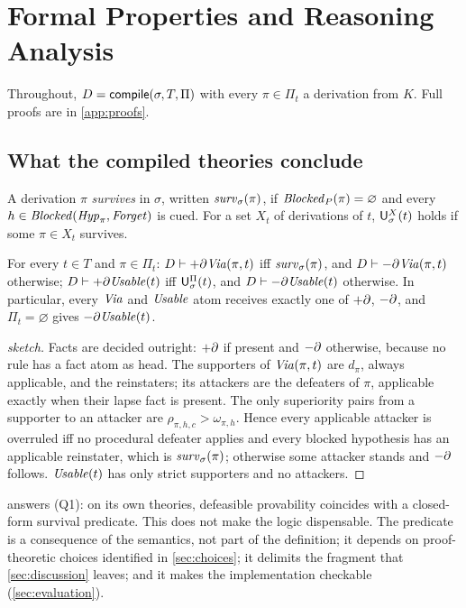 \section{Formal Properties and Reasoning Analysis}
\label{sec:properties}

Throughout, $D=\mathsf{compile}(\sigma,T,\Pi)$ with every $\pi\in\Pi_t$ a derivation from $K$. Full proofs are in \cref{app:proofs}.

\subsection{What the compiled theories conclude}

\begin{definition}[Survival]\label{def:surv}
A derivation $\pi$ \emph{survives} in $\sigma$, written $\mathit{surv}_\sigma(\pi)$, if $\mathit{Blocked}_{P}(\pi)=\varnothing$ and every $h\in\mathit{Blocked}(\mathit{Hyp}_\pi,\mathit{Forget})$ is cued. For a set $X_t$ of derivations of $t$, $\mathsf{U}^{X}_{\sigma}(t)$ holds if some $\pi\in X_t$ survives.
\end{definition}

\begin{theorem}[Characterisation]\label{thm:char}
For every $t\in T$ and $\pi\in\Pi_t$: $D\vdash+\partial\mathit{Via}(\pi,t)$ iff $\mathit{surv}_\sigma(\pi)$, and $D\vdash-\partial\mathit{Via}(\pi,t)$ otherwise; $D\vdash+\partial\mathit{Usable}(t)$ iff $\mathsf{U}^{\Pi}_{\sigma}(t)$, and $D\vdash-\partial\mathit{Usable}(t)$ otherwise. In particular, every $\mathit{Via}$ and $\mathit{Usable}$ atom receives exactly one of $+\partial$, $-\partial$, and $\Pi_t=\varnothing$ gives $-\partial\mathit{Usable}(t)$.
\end{theorem}

\begin{proof}[sketch]
Facts are decided outright: $+\partial$ if present and $-\partial$ otherwise, because no rule has a fact atom as head. The supporters of $\mathit{Via}(\pi,t)$ are $d_\pi$, always applicable, and the reinstaters; its attackers are the defeaters of $\pi$, applicable exactly when their lapse fact is present. The only superiority pairs from a supporter to an attacker are $\rho_{\pi,h,c}>\omega_{\pi,h}$. Hence every applicable attacker is overruled iff no procedural defeater applies and every blocked hypothesis has an applicable reinstater, which is $\mathit{surv}_\sigma(\pi)$; otherwise some attacker stands and $-\partial$ follows. $\mathit{Usable}(t)$ has only strict supporters and no attackers.
\end{proof}

 answers (Q1): on its own theories, defeasible provability coincides with a closed-form survival predicate. This does not make the logic dispensable. The predicate is a consequence of the semantics, not part of the definition; it depends on proof-theoretic choices identified in \cref{sec:choices}; it delimits the fragment that \cref{sec:discussion} leaves; and it makes the implementation checkable (\cref{sec:evaluation}).

